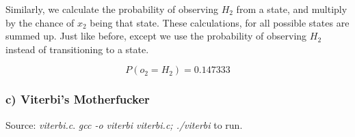 \documentclass[a4paper] {article}
\begin{document}
		Similarly, we calculate the probability of observing $H_2$ from a state, and multiply by the chance of $x_2$ being that state. These calculations, for all possible states are summed up. Just like before, except we use the probability of observing $H_2$ instead of transitioning to a state.

		$$P(o_2 = H_2) = 0.147333$$

	\subsubsection*{c) Viterbi's Motherfucker}

		Source: \emph{viterbi.c}. \emph{gcc -o viterbi viterbi.c; ./viterbi} to run.
\end{document}
